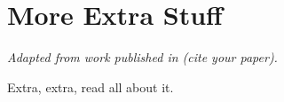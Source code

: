 \chapter{More Extra Stuff}
\label{chapter:appendixa}

\begin{center}
    \textit{Adapted from work published in (cite your paper).}
\end{center}

Extra, extra, read all about it.